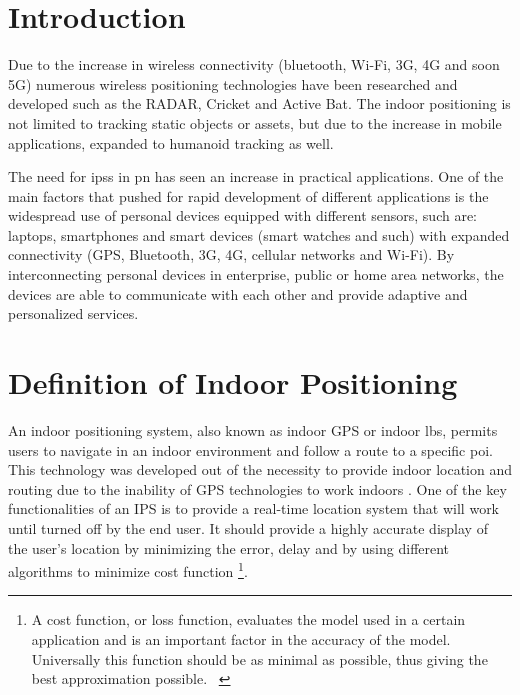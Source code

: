 \section{Introduction}
Due to the increase in wireless connectivity (bluetooth, Wi-Fi, 3G, 4G and soon 5G) numerous wireless positioning technologies have been researched and developed such as the RADAR, Cricket and Active Bat. The indoor positioning is not limited to tracking static objects or assets, but due to the increase in mobile applications, expanded to humanoid tracking as well.

The need for \acrshort{ips}s in \acrfull{pn} has seen an increase in practical applications. One of the main factors that pushed for rapid development of different applications is the widespread use of personal devices equipped with different sensors, such are: laptops, smartphones and smart devices (smart watches and such) with expanded connectivity (GPS, Bluetooth, 3G, 4G, cellular networks and Wi-Fi). By interconnecting personal devices in enterprise, public or home area networks, the devices are able to communicate with each other and provide adaptive and personalized services. 
\section{Definition of Indoor Positioning}
An indoor positioning system, also known as indoor GPS or indoor \acrfull{lbs}, permits users to navigate in an indoor environment and follow a route to a specific \acrfull{poi}. This technology was developed out of the necessity to provide indoor location and routing due to the inability of GPS technologies to work indoors \cite{Indoors2019}. One of the key functionalities of an IPS is to provide a real-time location system that will work until turned off by the end user. It should provide a highly accurate display of the user's location by minimizing the error, delay and by using different algorithms to minimize cost function \footnote{A cost function, or loss function, evaluates the model used in a certain application and is an important factor in the accuracy of the model. Universally this function should be as minimal as possible, thus giving the best approximation possible. ~\cite{Algorithmia}}. 
